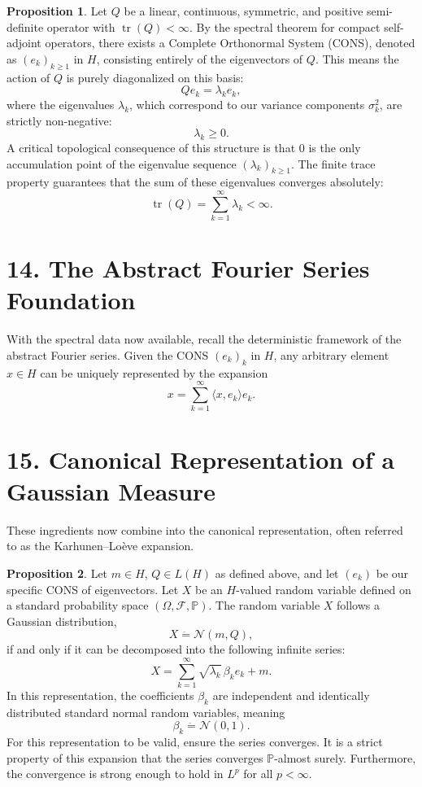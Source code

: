 \documentclass[11pt]{article}
\theoremstyle{definition}
\newtheorem{proposition}{Proposition}
\theoremstyle{remark}
\DeclareMathOperator{\tr}{tr}
\begin{document}
\begin{proposition}
Let $Q$ be a linear, continuous, symmetric, and positive semi-definite operator with \(\tr(Q)<\infty\). By the spectral theorem for compact self-adjoint operators, there exists a Complete Orthonormal System (CONS), denoted as \((e_k)_{k\ge 1}\) in $H$, consisting entirely of the eigenvectors of $Q$. This means the action of $Q$ is purely diagonalized on this basis:
\[
Qe_k=\lambda_k e_k,
\]
where the eigenvalues \(\lambda_k\), which correspond to our variance components \(\sigma_k^2\), are strictly non-negative:
\[
\lambda_k\ge 0.
\]
A critical topological consequence of this structure is that \(0\) is the only accumulation point of the eigenvalue sequence \((\lambda_k)_{k\ge 1}\). The finite trace property guarantees that the sum of these eigenvalues converges absolutely:
\[
\tr(Q)=\sum_{k=1}^\infty \lambda_k<\infty.
\]
\end{proposition}

\section*{14. The Abstract Fourier Series Foundation}
With the spectral data now available, recall the deterministic framework of the abstract Fourier series. Given the CONS \((e_k)_k\) in $H$, any arbitrary element \(x\in H\) can be uniquely represented by the expansion
\[
x=\sum_{k=1}^\infty \langle x,e_k\rangle e_k.
\]

\section*{15. Canonical Representation of a Gaussian Measure}
These ingredients now combine into the canonical representation, often referred to as the Karhunen--Lo\`eve expansion.

\begin{proposition}
Let \(m\in H\), \(Q\in L(H)\) as defined above, and let \((e_k)\) be our specific CONS of eigenvectors. Let \(X\) be an \(H\)-valued random variable defined on a standard probability space \((\Omega,\mathcal F,\mathbb P)\). The random variable \(X\) follows a Gaussian distribution,
\[
X\stackrel{\hat{\ }}{=}\mathcal N(m,Q),
\]
if and only if it can be decomposed into the following infinite series:
\[
X=\sum_{k=1}^\infty \sqrt{\lambda_k}\,\beta_k e_k+m.
\]
In this representation, the coefficients \(\beta_k\) are independent and identically distributed standard normal random variables, meaning
\[
\beta_k\stackrel{\hat{\ }}{=}\mathcal N(0,1).
\]
For this representation to be valid, ensure the series converges. It is a strict property of this expansion that the series converges \(\mathbb P\)-almost surely. Furthermore, the convergence is strong enough to hold in \(L^p\) for all \(p<\infty\).
\end{proposition}
\end{document}
